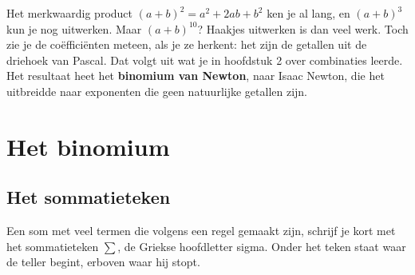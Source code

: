 %



Het merkwaardig product $(a + b)^2 = a^2 + 2ab + b^2$ ken je al lang, en $(a + b)^3$ kun je nog uitwerken. Maar $(a + b)^{10}$? Haakjes uitwerken is dan veel werk. Toch zie je de coëfficiënten meteen, als je ze herkent: het zijn de getallen uit de driehoek van Pascal. Dat volgt uit wat je in hoofdstuk 2 over combinaties leerde. Het resultaat heet het \textbf{binomium van Newton}, naar Isaac Newton, die het uitbreidde naar exponenten die geen natuurlijke getallen zijn.

\begin{oefeningen}[Start]

\end{oefeningen}


\section{Het binomium}

\subsection{Het sommatieteken}

Een som met veel termen die volgens een regel gemaakt zijn, schrijf je kort met het sommatieteken $\sum$, de Griekse hoofdletter sigma. Onder het teken staat waar de teller begint, erboven waar hij stopt.

